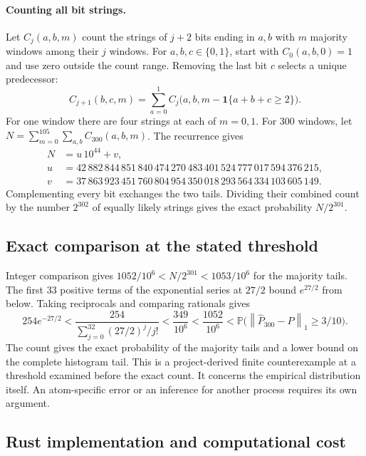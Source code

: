 \documentclass[11pt]{article}
\theoremstyle{definition}
\newcommand{\Phat}{\widehat{P}}
\newcommand{\Prb}{\mathbb{P}}
\newcommand{\Ind}{\mathbf{1}}
\newcommand{\normone}[1]{\left\lVert #1\right\rVert_1}
\begin{document}
\paragraph{Counting all bit strings.}
Let $C_j(a,b,m)$ count the strings of $j+2$ bits ending in $a,b$ with $m$ majority
windows among their $j$ windows. For $a,b,c\in\{0,1\}$, start with $C_0(a,b,0)=1$
and use zero outside the count range. Removing the last bit $c$ selects a unique predecessor:
\[
  C_{j+1}(b,c,m)=\sum_{a=0}^1 C_j\bigl(a,b,m-\Ind\{a+b+c\ge2\}\bigr).
\]
For one window there are four strings at each of $m=0,1$. For 300 windows, let
$N=\sum_{m=0}^{105}\sum_{a,b}C_{300}(a,b,m)$. The recurrence gives
\[
\begin{aligned}
  N &= u\,10^{44}+v,\\
  u &= 42\,882\,844\,851\,840\,474\,270\,483\,401\,524\,777\,017\,594\,376\,215,\\
  v &= 37\,863\,923\,451\,760\,804\,954\,350\,018\,293\,564\,334\,103\,605\,149.
\end{aligned}
\]
Complementing every bit exchanges the two tails. Dividing their combined count by the
number $2^{302}$ of equally likely strings gives the exact probability $N/2^{301}$.

\clearpage
\subsection*{Exact comparison at the stated threshold}

Integer comparison gives $1052/10^6<N/2^{301}<1053/10^6$ for the majority tails.
The first 33 positive terms of the exponential series at $27/2$ bound $e^{27/2}$
from below. Taking reciprocals and comparing rationals gives
\[
  254e^{-27/2}
   < \frac{254}{\sum_{j=0}^{32}(27/2)^j/j!}
   < \frac{349}{10^6}
   < \frac{1052}{10^6}
   < \Prb\bigl(\normone{\Phat_{300}-P}\ge3/10\bigr).
\]
The count gives the exact probability of the majority tails and a lower bound on the
complete histogram tail. This is a project-derived finite counterexample at a threshold
examined before the exact count. It concerns the empirical distribution itself. An
atom-specific error or an inference for another process requires its own argument.

\subsection*{Rust implementation and computational cost}
\end{document}
